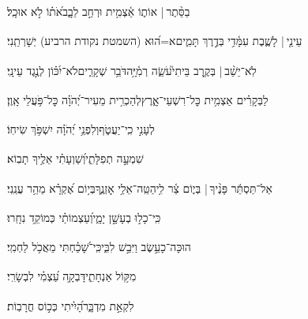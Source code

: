 \documentclass[12pt]{article}
\newcommand{\loc}[1]{\textsuperscript{\locf{#1}}}
\begin{document}
{\loc{ ה}~}‏ בַסֵּ֨תֶר |  {\hfill}אוֹת֢וֹ אַ֫צְמִ֥ית\newline\hspace*{.5em} וּרְחַ֣ב לֵבָ֑ב{\hfill}אֹ֝ת֗וֹ לֹ֣א אוּכָֽל׃\par

{\loc{ ו}~}‏עֵינַ֤י |  {\hfill}לָשֶׁ֢בֶת עִמָּ֫דִ֥י\newline\hspace*{.5em} בְּדֶ֣רֶךְ תָּמִ֑ים{\hfill}א=ה֝וּא (השמטת נקודת הרביע) יְשָׁרְתֵֽנִי׃\par

{\loc{ ז}~}‏לֹֽא־יֵשֵׁ֨ב |  בְּקֶ֥רֶב בֵּיתִי֮{\hfill}עֹשֵׂ֢ה רְמִ֫יָּ֥ה\newline\hspace*{.5em}דֹּבֵ֥ר שְׁקָרִ֑ים{\hfill}לֹא־יִ֝כּ֗וֹן לְנֶ֣גֶד עֵינָֽי׃\par

{\loc{ ח}~}‏לַבְּקָרִ֗ים אַצְמִ֥ית כׇּל־רִשְׁעֵי־אָ֑רֶץ{\hfill}לְהַכְרִ֥ית מֵעִיר־יְ֝הֹוָ֗ה כׇּל־פֹּ֥עֲלֵי אָֽוֶן׃\par\pend
\ledpb
\pstart[\subsection*{\textcolor{red}{פרק קב}}]\label{פרק קב}
{\loc{ א}~}‏ לְעָנִ֣י כִֽי־יַעֲטֹ֑ף{\hfill}וְלִפְנֵ֥י יְ֝הֹוָ֗ה יִשְׁפֹּ֥ךְ שִׂיחֽוֹ׃\par

{\loc{ ב}~}‏ שִׁמְעָ֣ה תְפִלָּתִ֑י{\hfill}וְ֝שַׁוְעָתִ֗י אֵלֶ֥יךָ תָבֽוֹא׃\par

{\loc{ ג}~}‏אַל־תַּסְתֵּ֬ר פָּנֶ֨יךָ |  {\hfill}בְּי֢וֹם צַ֫ר לִ֥י\newline\hspace*{.5em}הַטֵּֽה־אֵלַ֥י אׇזְנֶ֑ךָ{\hfill}בְּי֥וֹם אֶ֝קְרָ֗א מַהֵ֥ר עֲנֵֽנִי׃\par

{\loc{ ד}~}‏כִּֽי־כָל֣וּ בְעָשָׁ֣ן יָמָ֑י{\hfill}וְ֝עַצְמוֹתַ֗י כְּמוֹקֵ֥ד נִחָֽרוּ׃\par

{\loc{ ה}~}‏הוּכָּה־כָעֵ֣שֶׂב וַיִּבַ֣שׁ לִבִּ֑י{\hfill}כִּֽי־שָׁ֝כַ֗חְתִּי מֵאֲכֹ֥ל לַחְמִֽי׃\par

{\loc{ ו}~}‏מִקּ֥וֹל אַנְחָתִ֑י{\hfill}דָּבְקָ֥ה עַ֝צְמִ֗י לִבְשָׂרִֽי׃\par

{\loc{ ז}~}‏ לִקְאַ֣ת מִדְבָּ֑ר{\hfill}הָ֝יִ֗יתִי כְּכ֣וֹס חֳרָבֽוֹת׃\par
\end{document}
